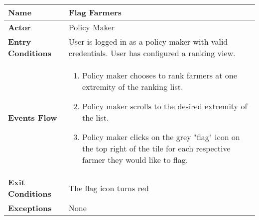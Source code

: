 
\begin{center}
\begin{tabular}{|l|>{\raggedright\arraybackslash}m{12cm}|}

    \hline
    \textbf{Name} & Flag Farmers\\
    \hline
   	\textbf{Actor} & Policy Maker\\
    \hline
    \textbf{Entry Conditions} & User is logged in as a policy maker with valid credentials. User has configured a ranking view.\\
    \hline
    \textbf{Events Flow} & \begin{enumerate}
    \item Policy maker chooses to rank farmers at one extremity of the ranking list. 
    \item Policy maker scrolls to the desired extremity of the list.
    \item Policy maker clicks on the grey "flag" icon on the top right of the tile for each respective farmer they would like to flag. 
    \end{enumerate}\\
    \hline
    \textbf{Exit Conditions} & The flag icon turns red \\
    \hline
    \textbf{Exceptions} & None\\
    \hline
\end{tabular}
\end{center}